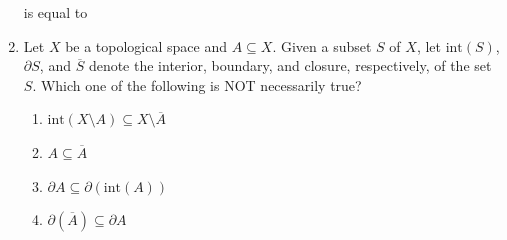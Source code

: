 \documentclass[journal]{IEEEtran}
\numberwithin{equation}{enumi}
\numberwithin{figure}{enumi}
\begin{document}
\begin{enumerate}
is equal to 

\begin{enumerate}
\end{enumerate}

\bigskip
\item Let $ X $ be a topological space and $ A \subseteq X $. Given a subset $ S $ of $ X $, let $\text{int}(S)$, $\partial S$, and $\overline{S}$ denote the interior, boundary, and closure, respectively, of the set $ S $. Which one of the following is NOT necessarily true?

\vspace{0.5cm}

\begin{enumerate}
        \item  $ \text{int}(X \setminus A) \subseteq X \setminus \overline{A} $
        \item  $ A \subseteq \overline{A} $
        \item  $ \partial A \subseteq \partial (\text{int}(A)) $
        \item  $ \partial (\overline{A}) \subseteq \partial A $
\end{enumerate}
\end{enumerate}
\end{document}
